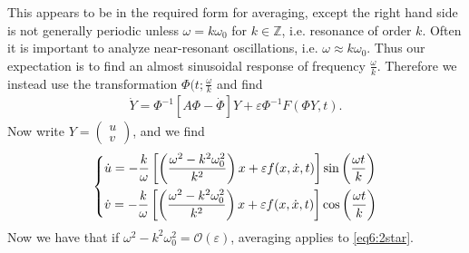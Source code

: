 \begin{ex}
 This appears to be in the required form for averaging, except the right hand side is not generally periodic unless $\omega= k \omega_0$ for $k \in \mathbb{Z}$, i.e. resonance of order $k$. Often it is important to analyze near-resonant oscillations, i.e. $\omega\approx k \omega_0$. Thus our expectation is to find an almost sinusoidal response of frequency $\frac{\omega }{k}$. Therefore we instead use the transformation  $\Phi(t; \frac{\omega }{k}$ and find
 \begin{align}
	 \dot{Y } = \Phi^{-1}\left[ A \Phi - \dot{\Phi}\right] Y + \varepsilon \Phi^{-1}F(\Phi Y, t). 	
 \end{align}
Now write $Y = 
\begin{pmatrix}
	u \\ v
\end{pmatrix}
$, and we find
\begin{align}
\begin{dcases}
	\dot{u} = -\frac{k}{\omega} \left[ \left( \frac{\omega^2 - k^2 \omega_0^2}{k^2}\right)x + \varepsilon f(x, \dot{x}, t) \right] \sin\left(\frac{\omega t}{k}\right) \\
	\dot{v} = -\frac{k}{\omega} \left[ \left( \frac{\omega^2 - k^2 \omega_0^2}{k^2}\right)x + \varepsilon f(x, \dot{x}, t) \right] \cos\left(\frac{\omega t}{k}\right)
\end{dcases}
\end{align}
Now we have that if $\omega^2 - k^2 \omega_0^2 = \mathcal{O}(\varepsilon)$, averaging applies to \eqref{eq6:2star}.


\end{ex}
